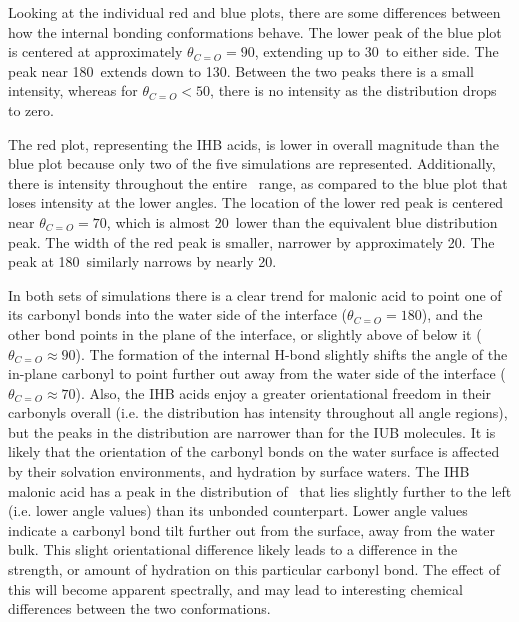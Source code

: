 Looking at the individual red and blue plots, there are some differences between how the internal bonding conformations behave. The lower peak of the blue plot is centered at approximately $\theta_{C=O}=90$\degr, extending up to 30\degr~to either side. The peak near 180\degr~extends down to 130\degr. Between the two peaks there is a small intensity, whereas for $\theta_{C=O} < 50$\degr, there is no intensity as the distribution drops to zero. 

The red plot, representing the IHB acids, is lower in overall magnitude than the blue plot because only two of the five simulations are represented. Additionally, there is intensity throughout the entire \thetacarb~range, as compared to the blue plot that loses intensity at the lower angles. The location of the lower red peak is centered near $\theta_{C=O}=70$\degr, which is almost 20\degr~lower than the equivalent blue distribution peak. The width of the red peak is smaller, narrower by approximately 20\degr. The peak at 180\degr~similarly narrows by nearly 20\degr.

In both sets of simulations there is a clear trend for malonic acid to point one of its carbonyl bonds into the water side of the interface ($\theta_{C=O}=180$\degr), and the other bond points in the plane of the interface, or slightly above of below it ($\theta_{C=O} \approx 90$\degr). The formation of the internal H-bond slightly shifts the angle of the in-plane carbonyl to point further out away from the water side of the interface ($\theta_{C=O} \approx 70$\degr). Also, the IHB acids enjoy a greater orientational freedom in their carbonyls overall (i.e. the distribution has intensity throughout all angle regions), but the peaks in the distribution are narrower than for the IUB molecules. It is likely that the orientation of the carbonyl bonds on the water surface is affected by their solvation environments, and hydration by surface waters. The IHB malonic acid has a peak in the distribution of \thetacarb~that lies slightly further to the left (i.e. lower angle values) than its unbonded counterpart. Lower angle values indicate a carbonyl bond tilt further out from the surface, away from the water bulk. This slight orientational difference likely leads to a difference in the strength, or amount of hydration on this particular carbonyl bond. The effect of this will become apparent spectrally, and may lead to interesting chemical differences between the two conformations.
